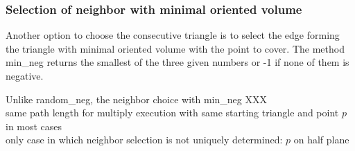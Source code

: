 \documentclass[10pt]{article}
\begin{document}
\subsubsection{Selection of neighbor with minimal oriented volume} \label{min_neg_vol}

Another option to choose the consecutive triangle is to select the edge forming the triangle with minimal oriented volume with the point to cover. The method {\ttfamily min\_neg} returns the smallest of the three given numbers or -1 if none of them is negative.

Unlike {\ttfamily random\_neg}, the neighbor choice with {\ttfamily min\_neg} XXX \\

same path length for multiply execution with same starting triangle and point $p$ in most cases\\
only case in which neighbor selection is not uniquely determined: $p$ on half plane


\begin{figure}[h]
\end{figure}
\end{document}
